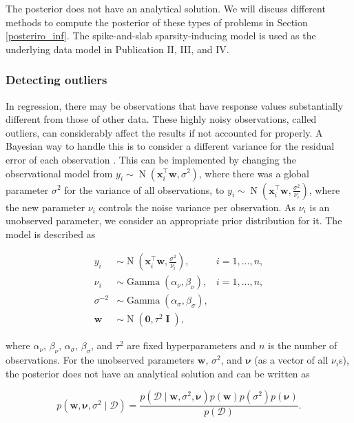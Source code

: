 \documentclass[dissertation,math,vertlayout,pdfa,colorlinks]{aaltoseries}
\newcommand{\bw}{\bm{w}}
\newcommand{\bD}{\mathcal{D}}
\DeclareMathOperator{\eye}{\textbf{I}}
\DeclareMathOperator{\normalpdf}{N}
\DeclareMathOperator{\gammapdf}{Gamma}
\newcommand{\tp}{^{\top}}
\begin{document}
The posterior does not have an analytical solution. We will discuss different methods to compute the posterior of these types of problems in Section \ref{posteriro_inf}. The spike-and-slab sparsity-inducing model \cite{spike_slab1993} is used as the underlying data model in Publication II, III, and IV. 


\subsubsection{Detecting outliers}

In regression, there may be observations that have response values substantially different from those of other data. These highly noisy observations, called outliers, can considerably affect the results if not accounted for properly. A Bayesian way to handle this is to consider a different variance for the residual error of each observation \cite{Bayesian_ARD2007,Kangasraasio_2016_interactive}. This can be implemented by changing the observational model from $y_i\sim \normalpdf(\bm{x}_i\tp\bw,\sigma^2)$, where there was a global parameter $\sigma^2$ for the variance of all observations, to $y_i \sim \normalpdf(\bm{x}_i\tp\bw,\frac{\sigma^2}{\nu_i})$, where the new parameter $\nu_i$ controls the noise variance per observation. As $\nu_i$ is an unobserved parameter, we consider an appropriate prior distribution for it. The model is described as 

	
\begin{align}\label{Eq:ard_Bayesian_regression}
y_i &\sim \normalpdf(\bm{x}_i\tp\bw,\frac{\sigma^2}{\nu_i}),  & i=1,\ldots,n,\\
\nu_i &\sim \gammapdf(\alpha_{\nu}, \beta_{\nu}), & i=1,\ldots,n,\nonumber \\
\sigma^{-2} &\sim \gammapdf(\alpha_{\sigma}, \beta_{\sigma}), \nonumber \\
\bw &\sim \normalpdf(\textbf{0},\tau^2 \eye), \nonumber
\end{align}

\noindent where $\alpha_{\nu}$, $\beta_{\nu}$, $\alpha_{\sigma}$, $\beta_{\sigma}$, and $\tau^2$ are fixed hyperparameters and $n$ is the number of observations. For the unobserved parameters $\bw$, $\sigma^2$, and $\bm{\nu}$ (as a vector of all $\nu_i$s), the posterior does not have an analytical solution and can be written as

\begin{equation}\label{Eq:Bayes_rule_ARD}
p(\bw, \bm{\nu}, \sigma^2 \mid \bD) = \frac{p(\bD \mid \bw, \sigma^2, \bm{\nu})p(\bw)p(\sigma^2)p(\bm{\nu})}{p(\bD)}.
\end{equation} 
\end{document}
